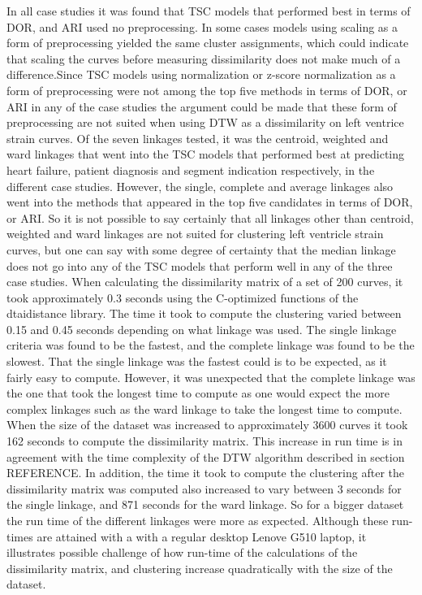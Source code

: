 In all case studies it was found that TSC models that performed best in terms of DOR, and ARI used no preprocessing. In some cases models using scaling as a form of preprocessing yielded the same cluster assignments, which could indicate that scaling the curves before measuring dissimilarity does not make much of a difference.Since TSC models using normalization or z-score normalization as a form of preprocessing were not among the top five methods in terms of DOR, or ARI in any of the case studies the argument could be made that these form of preprocessing are not suited when using DTW as a dissimilarity on left ventrice strain curves.
Of the seven linkages tested, it was the centroid, weighted and ward linkages that went into the TSC models that performed best at predicting heart failure, patient diagnosis and segment indication respectively, in the different case studies. However, the single, complete and average linkages also went into the methods that appeared in the top five candidates in terms of DOR, or ARI. So it is not possible to say certainly that all linkages other than centroid, weighted and ward linkages are not suited for clustering left ventricle strain curves, but one can say with some degree of certainty that the median linkage does not go into any of the TSC models that perform well in any of the three case studies. 
When calculating the dissimilarity matrix of a set of 200 curves, it took approximately 0.3 seconds using the C-optimized functions of the dtaidistance library. The time it took to compute the clustering varied between 0.15 and 0.45 seconds depending on what linkage was used. The single linkage criteria was found to be the fastest, and the complete linkage was found to be the slowest. That the single linkage was the fastest could is to be expected, as it fairly easy to compute. However, it was unexpected that the complete linkage was the one that took the longest time to compute as one would expect the more complex linkages such as the ward linkage to take the longest time to compute. When the size of the dataset was increased to approximately 3600 curves it took 162 seconds to compute the dissimilarity matrix. This increase in run time is in agreement with the time complexity of the DTW algorithm described in section REFERENCE. In addition, the time it took to compute the clustering after the dissimilarity matrix was computed also increased to vary between 3 seconds for the single linkage, and 871 seconds for the ward linkage. So for a bigger dataset the run time of the different linkages were more as expected. Although these run-times are attained with a with a regular desktop Lenove G510 laptop, it illustrates possible challenge of how run-time of the calculations of the dissimilarity matrix, and clustering increase quadratically with the size of the dataset.
